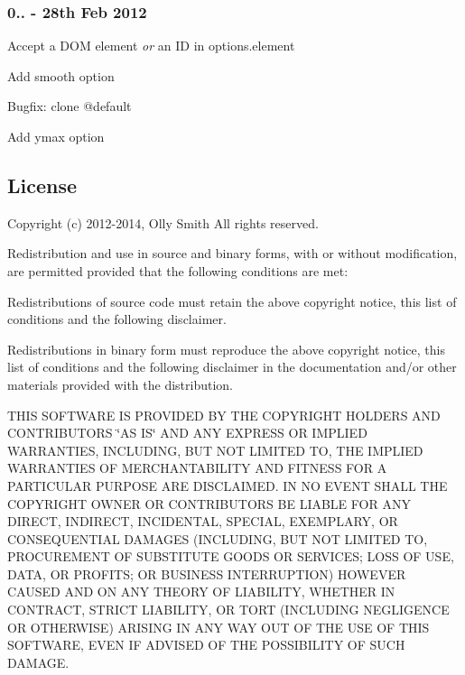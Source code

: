 \subsubsection*{0.. -\/ 28th Feb 2012}


\begin{DoxyItemize}
\item Accept a D\+OM element {\itshape or} an ID in {\ttfamily options.\+element}
\item Add {\ttfamily smooth} option
\item Bugfix\+: clone {\ttfamily @default}
\item Add {\ttfamily ymax} option
\end{DoxyItemize}

\subsection*{License}

Copyright (c) 2012-\/2014, Olly Smith All rights reserved.

Redistribution and use in source and binary forms, with or without modification, are permitted provided that the following conditions are met\+:


\begin{DoxyEnumerate}
\item Redistributions of source code must retain the above copyright notice, this list of conditions and the following disclaimer.
\item Redistributions in binary form must reproduce the above copyright notice, this list of conditions and the following disclaimer in the documentation and/or other materials provided with the distribution.
\end{DoxyEnumerate}

T\+H\+IS S\+O\+F\+T\+W\+A\+RE IS P\+R\+O\+V\+I\+D\+ED BY T\+HE C\+O\+P\+Y\+R\+I\+G\+HT H\+O\+L\+D\+E\+RS A\+ND C\+O\+N\+T\+R\+I\+B\+U\+T\+O\+RS \char`\"{}\+A\+S I\+S\char`\"{} A\+ND A\+NY E\+X\+P\+R\+E\+SS OR I\+M\+P\+L\+I\+ED W\+A\+R\+R\+A\+N\+T\+I\+ES, I\+N\+C\+L\+U\+D\+I\+NG, B\+UT N\+OT L\+I\+M\+I\+T\+ED TO, T\+HE I\+M\+P\+L\+I\+ED W\+A\+R\+R\+A\+N\+T\+I\+ES OF M\+E\+R\+C\+H\+A\+N\+T\+A\+B\+I\+L\+I\+TY A\+ND F\+I\+T\+N\+E\+SS F\+OR A P\+A\+R\+T\+I\+C\+U\+L\+AR P\+U\+R\+P\+O\+SE A\+RE D\+I\+S\+C\+L\+A\+I\+M\+ED. IN NO E\+V\+E\+NT S\+H\+A\+LL T\+HE C\+O\+P\+Y\+R\+I\+G\+HT O\+W\+N\+ER OR C\+O\+N\+T\+R\+I\+B\+U\+T\+O\+RS BE L\+I\+A\+B\+LE F\+OR A\+NY D\+I\+R\+E\+CT, I\+N\+D\+I\+R\+E\+CT, I\+N\+C\+I\+D\+E\+N\+T\+AL, S\+P\+E\+C\+I\+AL, E\+X\+E\+M\+P\+L\+A\+RY, OR C\+O\+N\+S\+E\+Q\+U\+E\+N\+T\+I\+AL D\+A\+M\+A\+G\+ES (I\+N\+C\+L\+U\+D\+I\+NG, B\+UT N\+OT L\+I\+M\+I\+T\+ED TO, P\+R\+O\+C\+U\+R\+E\+M\+E\+NT OF S\+U\+B\+S\+T\+I\+T\+U\+TE G\+O\+O\+DS OR S\+E\+R\+V\+I\+C\+ES; L\+O\+SS OF U\+SE, D\+A\+TA, OR P\+R\+O\+F\+I\+TS; OR B\+U\+S\+I\+N\+E\+SS I\+N\+T\+E\+R\+R\+U\+P\+T\+I\+ON) H\+O\+W\+E\+V\+ER C\+A\+U\+S\+ED A\+ND ON A\+NY T\+H\+E\+O\+RY OF L\+I\+A\+B\+I\+L\+I\+TY, W\+H\+E\+T\+H\+ER IN C\+O\+N\+T\+R\+A\+CT, S\+T\+R\+I\+CT L\+I\+A\+B\+I\+L\+I\+TY, OR T\+O\+RT (I\+N\+C\+L\+U\+D\+I\+NG N\+E\+G\+L\+I\+G\+E\+N\+CE OR O\+T\+H\+E\+R\+W\+I\+SE) A\+R\+I\+S\+I\+NG IN A\+NY W\+AY O\+UT OF T\+HE U\+SE OF T\+H\+IS S\+O\+F\+T\+W\+A\+RE, E\+V\+EN IF A\+D\+V\+I\+S\+ED OF T\+HE P\+O\+S\+S\+I\+B\+I\+L\+I\+TY OF S\+U\+CH D\+A\+M\+A\+GE. 